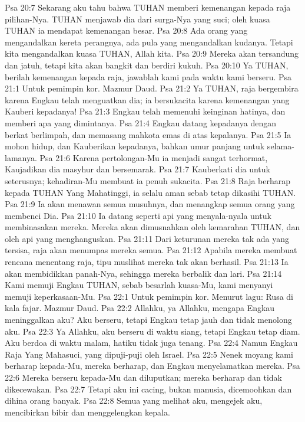 Psa 20:7  Sekarang aku tahu bahwa TUHAN memberi kemenangan kepada raja pilihan-Nya. TUHAN menjawab dia dari surga-Nya yang suci; oleh kuasa TUHAN ia mendapat kemenangan besar.
Psa 20:8  Ada orang yang mengandalkan kereta perangnya, ada pula yang mengandalkan kudanya. Tetapi kita mengandalkan kuasa TUHAN, Allah kita.
Psa 20:9  Mereka akan tersandung dan jatuh, tetapi kita akan bangkit dan berdiri kukuh.
Psa 20:10  Ya TUHAN, berilah kemenangan kepada raja, jawablah kami pada waktu kami berseru.
Psa 21:1  Untuk pemimpin kor. Mazmur Daud.
Psa 21:2  Ya TUHAN, raja bergembira karena Engkau telah menguatkan dia; ia bersukacita karena kemenangan yang Kauberi kepadanya!
Psa 21:3  Engkau telah memenuhi keinginan hatinya, dan memberi apa yang dimintanya.
Psa 21:4  Engkau datang kepadanya dengan berkat berlimpah, dan memasang mahkota emas di atas kepalanya.
Psa 21:5  Ia mohon hidup, dan Kauberikan kepadanya, bahkan umur panjang untuk selama-lamanya.
Psa 21:6  Karena pertolongan-Mu ia menjadi sangat terhormat, Kaujadikan dia masyhur dan bersemarak.
Psa 21:7  Kauberkati dia untuk seterusnya; kehadiran-Mu membuat ia penuh sukacita.
Psa 21:8  Raja berharap kepada TUHAN Yang Mahatinggi, ia selalu aman sebab tetap dikasihi TUHAN.
Psa 21:9  Ia akan menawan semua musuhnya, dan menangkap semua orang yang membenci Dia.
Psa 21:10  Ia datang seperti api yang menyala-nyala untuk membinasakan mereka. Mereka akan dimusnahkan oleh kemarahan TUHAN, dan oleh api yang menghanguskan.
Psa 21:11  Dari keturunan mereka tak ada yang tersisa, raja akan menumpas mereka semua.
Psa 21:12  Apabila mereka membuat rencana menentang raja, tipu muslihat mereka tak akan berhasil.
Psa 21:13  Ia akan membidikkan panah-Nya, sehingga mereka berbalik dan lari.
Psa 21:14  Kami memuji Engkau TUHAN, sebab besarlah kuasa-Mu, kami menyanyi memuji keperkasaan-Mu.
Psa 22:1  Untuk pemimpin kor. Menurut lagu: Rusa di kala fajar. Mazmur Daud.
Psa 22:2  Allahku, ya Allahku, mengapa Engkau meninggalkan aku? Aku berseru, tetapi Engkau tetap jauh dan tidak menolong aku.
Psa 22:3  Ya Allahku, aku berseru di waktu siang, tetapi Engkau tetap diam. Aku berdoa di waktu malam, hatiku tidak juga tenang.
Psa 22:4  Namun Engkau Raja Yang Mahasuci, yang dipuji-puji oleh Israel.
Psa 22:5  Nenek moyang kami berharap kepada-Mu, mereka berharap, dan Engkau menyelamatkan mereka.
Psa 22:6  Mereka berseru kepada-Mu dan diluputkan; mereka berharap dan tidak dikecewakan.
Psa 22:7  Tetapi aku ini cacing, bukan manusia, dicemoohkan dan dihina orang banyak.
Psa 22:8  Semua yang melihat aku, mengejek aku, mencibirkan bibir dan menggelengkan kepala.
